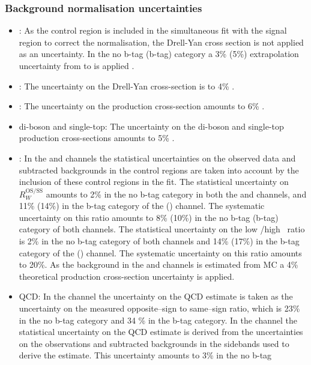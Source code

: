 \subsubsection*{Background normalisation uncertainties}
\begin{itemize}
\setlength{\itemsep}{-\baselineskip}
\item \Ztautau: As the \Zmm control region is included in the simultaneous
fit with the signal region to correct the \Ztautau normalisation,
the Drell-Yan cross section is not applied as an uncertainty. In the no b-tag (b-tag) category a 3\% (5\%)
extrapolation uncertainty from \Zmm to \Ztautau is applied \cite{CMS-PAS-HIG-16-037}.
\item \Zellell: The uncertainty on the Drell-Yan cross-section
is to 4\% \cite{CMS-PAS-HIG-16-037}.
\item \ttbar: The uncertainty on the \ttbar production cross-section amounts
to 6\% \cite{CMS-PAS-HIG-16-037}.
\item di-boson and single-top: The uncertainty on the di-boson and
single-top production cross-sections amounts to 5\% \cite{CMS-PAS-HIG-16-037}.
\item \Wjets: In the \mutau and \etau channels the statistical uncertainties
on the observed data and subtracted backgrounds in the control regions are taken into account by
the inclusion of these control regions in the fit. The statistical
uncertainty on $R_{W}^{\text{OS/SS}}$ amounts to 2\% in the no b-tag
category in both the \etau and \mutau channels, and 11\% (14\%) in the b-tag
category of the \mutau (\etau) channel. The systematic uncertainty on
this ratio amounts to 8\% (10\%) in the no b-tag (b-tag) category of both channels.
The statistical uncertainty on the low \mT/high \mT~ratio is 2\% in the no b-tag
category of both channels and 14\% (17\%) in the b-tag category of the \mutau (\etau) channel.
The systematic uncertainty on this ratio amounts to 20\%. As the \Wjets background
in the \tautau and \emu channels is estimated from \ac{MC} a 4\% theoretical
production cross-section uncertainty is applied.
\item QCD: In the \emu channel the uncertainty on the QCD estimate
is taken as the uncertainty on the measured opposite--sign to same--sign
ratio, which is 23\% in the no b-tag category and 34 \% in the b-tag category. In the
\tautau channel the statistical uncertainty on the QCD estimate is derived from
the uncertainties on the observations and subtracted backgrounds in the
sidebands used to derive the estimate. This uncertainty amounts to 3\% in the no b-tag

\end{itemize}
